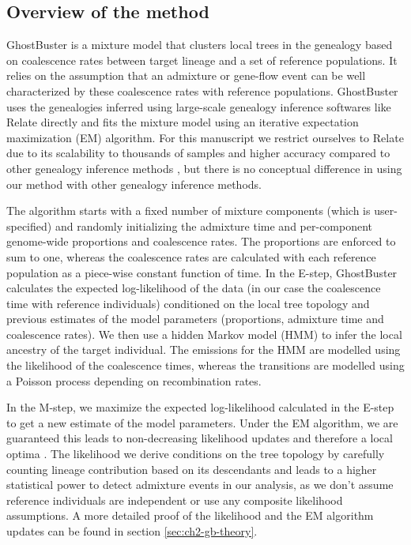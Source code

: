 \subsection{Overview of the method}

GhostBuster is a mixture model that clusters local trees in the genealogy based on coalescence rates between target lineage and a set of reference populations.
%
It relies on the assumption that an admixture or gene-flow event can be well characterized by these coalescence rates with reference populations.  
%
GhostBuster uses the genealogies inferred using large-scale genealogy inference softwares like Relate \cite{speidel2019method} directly and fits the mixture model using an iterative expectation maximization (EM) algorithm.
%
For this manuscript we restrict ourselves to Relate due to its scalability to thousands of samples and higher accuracy compared to other genealogy inference methods \cite{brandt2022evaluation}, but there is no conceptual difference in using our method with other genealogy inference methods.

The algorithm starts with a fixed number of mixture components (which is user-specified) and randomly initializing the admixture time and per-component genome-wide proportions and coalescence rates. 
%
The proportions are enforced to sum to one, whereas the coalescence rates are calculated with each reference population as a piece-wise constant function of time. 
%
In the E-step, GhostBuster calculates the expected log-likelihood of the data (in our case the coalescence time with reference individuals) conditioned on the local tree topology and previous estimates of the model parameters (proportions, admixture time and coalescence rates). 
%
We then use a hidden Markov model (HMM) to infer the local ancestry of the target individual.
%
The emissions for the HMM are modelled using the likelihood of the coalescence times, whereas the transitions are modelled using a Poisson process depending on recombination rates. 

In the M-step, we maximize the expected log-likelihood calculated in the E-step to get a new estimate of the model parameters. 
%
Under the EM algorithm, we are guaranteed this leads to non-decreasing likelihood updates and therefore a local optima \cite{dempster1977maximum}. 
%
The likelihood we derive conditions on the tree topology by carefully counting lineage contribution based on its descendants and leads to a higher statistical power to detect admixture events in our analysis, as we don't assume reference individuals are independent or use any composite likelihood assumptions.
%
A more detailed proof of the likelihood and the EM algorithm updates can be found in section \ref{sec:ch2-gb-theory}. 

